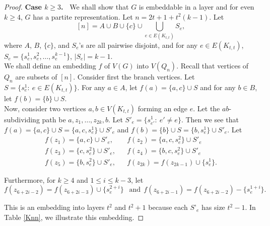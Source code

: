 \documentclass[11pt, a4paper]{article}
\begin{document}
\begin{proof}
\noindent 
{\bf Case $k\geq 3$.~ } We shall show that  $G$ is embeddable in a layer and for even $k\ge 4$, $G$ has a partite representation.
 Let $n= 2t+1+ t^2(k-1)$.  
Let $$[n] =A \cup B  \cup  \{c\} \cup \bigcup_{e\in E(K_{t,t})} S_e,$$
where $A$, $B$, $\{c\}$,  and $S_e$'s are all pairwise disjoint,  and for any $e\in E(K_{t,t})$,   $S_e=\{s_e^1, s_e^2, \ldots, s_e^{k-1}\}$, $|S_e|=k-1$.\\

We shall define an embedding $f$ of $V(G)$ into $V(Q_n)$. 
Recall that vertices of $Q_n$  are subsets of $[n]$.   Consider first the branch vertices. Let $S= \{s_e^1: ~ e\in E(K_{t,t})\}$.  For any $a\in A$, let $f(a) = \{a,c \}\cup S$ and  for  any $b\in B$, let $f(b) = \{b\}\cup S$. \\


 
 Now, consider two vertices $a, b\in V(K_{t,t})$ forming an edge $e$. 
 Let the $ab$-subdividing path be $a, z_1, \ldots, z_{2k}, b $.  
 Let $S'_e= \{s_{e'}^1: ~ e'\neq e\}$. 
 Then we see that $f(a) =\{a,c \}\cup S= \{a, c,  s_e^1 \} \cup S'_e$ and $f(b) =\{b\}\cup S= \{b, s_e^1\}\cup S'_e$. 
 Let 
 \begin{eqnarray*}
  f(z_1) = \{a, c \} \cup S'_e,&& f(z_2) = \{a, c,  s_e^2 \} \cup S'_e\\
  f(z_3) = \{  c, s_e^2\} \cup S'_e,&& f(z_4) = \{b, c, s_e^2\} \cup S'_e \\
  f(z_5) = \{b, s_e^2 \} \cup  S'_e, && f(z_{2k}) = f(z_{2k-1})\cup \{s_e^1\}.
 \end{eqnarray*}
 
 Furthermore, for $k\geq 4$ and $ 1\leq i \leq k-3$, let 
 $$f(z_{6+2i-2} ) = f(z_{6+2i-3}) \cup \{s_e^{2+i}\}~~ \mbox{ and}   ~~f(z_{6+2i-1} ) = f(z_{6+2i-2}) -\{s_e^{1+i}\}.$$

This is an embedding into layers $t^2$ and $t^2+1$ because each $S’_e$ has size $t^2-1$.
In Table \ref{Knn}, we illustrate this embedding.
  


\end{proof}
\end{document}
